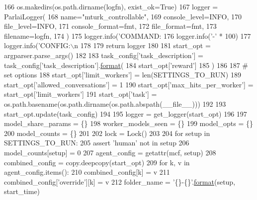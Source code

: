 \begin{DoxyCode}
{{166                 os.makedirs(os.path.dirname(logfn), exist\_ok=\textcolor{keyword}{True})
167         logger = ParlaiLogger(
168             name=\textcolor{stringliteral}{"mturk\_controllable"},
169             console\_level=INFO,
170             file\_level=INFO,
171             console\_format=fmt,
172             file\_format=fmt,
173             filename=logfn,
174         )
175         logger.info(\textcolor{stringliteral}{'COMMAND: %
176         logger.info(\textcolor{stringliteral}{'-'} * 100)
177         logger.info(\textcolor{stringliteral}{'CONFIG:\(\backslash\)n%
178 
179         \textcolor{keywordflow}{return} logger
180 
181     start\_opt = argparser.parse\_args()
182 
183     task\_config[\textcolor{stringliteral}{'task\_description'}] = task\_config[\textcolor{stringliteral}{'task\_description'}].\hyperlink{namespaceparlai_1_1chat__service_1_1services_1_1messenger_1_1shared__utils_a32e2e2022b824fbaf80c747160b52a76}{format}(
184         start\_opt[\textcolor{stringliteral}{'reward'}]
185     )
186 
187     \textcolor{comment}{# set options}
188     start\_opt[\textcolor{stringliteral}{'limit\_workers'}] = len(SETTINGS\_TO\_RUN)
189     start\_opt[\textcolor{stringliteral}{'allowed\_conversations'}] = 1
190     start\_opt[\textcolor{stringliteral}{'max\_hits\_per\_worker'}] = start\_opt[\textcolor{stringliteral}{'limit\_workers'}]
191     start\_opt[\textcolor{stringliteral}{'task'}] = os.path.basename(os.path.dirname(os.path.abspath(\_\_file\_\_)))
192 
193     start\_opt.update(task\_config)
194 
195     logger = get\_logger(start\_opt)
196 
197     model\_share\_params = \{\}
198     worker\_models\_seen = \{\}
199     model\_opts = \{\}
200     model\_counts = \{\}
201 
202     lock = Lock()
203 
204     \textcolor{keywordflow}{for} setup \textcolor{keywordflow}{in} SETTINGS\_TO\_RUN:
205         \textcolor{keyword}{assert} \textcolor{stringliteral}{'human'} \textcolor{keywordflow}{not} \textcolor{keywordflow}{in} setup
206         model\_counts[setup] = 0
207         agent\_config = getattr(mcf, setup)
208         combined\_config = copy.deepcopy(start\_opt)
209         \textcolor{keywordflow}{for} k, v \textcolor{keywordflow}{in} agent\_config.items():
210             combined\_config[k] = v
211             combined\_config[\textcolor{stringliteral}{'override'}][k] = v
212         folder\_name = \textcolor{stringliteral}{'\{\}-\{\}'}.\hyperlink{namespaceparlai_1_1chat__service_1_1services_1_1messenger_1_1shared__utils_a32e2e2022b824fbaf80c747160b52a76}{format}(setup, start\_time)
}}}}
\end{DoxyCode}
